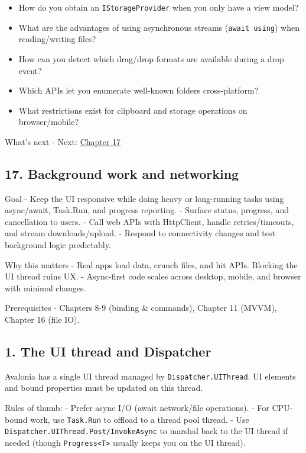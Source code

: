 \begin{itemize}
\tightlist
\item
  How do you obtain an \passthrough{\lstinline!IStorageProvider!} when
  you only have a view model?
\item
  What are the advantages of using asynchronous streams
  (\passthrough{\lstinline!await using!}) when reading/writing files?
\item
  How can you detect which drag/drop formats are available during a drop
  event?
\item
  Which APIs let you enumerate well-known folders cross-platform?
\item
  What restrictions exist for clipboard and storage operations on
  browser/mobile?
\end{itemize}

What's next - Next: \href{Chapter17.md}{Chapter 17}

\newpage

\subsection{17. Background work and
networking}\label{background-work-and-networking}

Goal - Keep the UI responsive while doing heavy or long-running tasks
using async/await, Task.Run, and progress reporting. - Surface status,
progress, and cancellation to users. - Call web APIs with HttpClient,
handle retries/timeouts, and stream downloads/upload. - Respond to
connectivity changes and test background logic predictably.

Why this matters - Real apps load data, crunch files, and hit APIs.
Blocking the UI thread ruins UX. - Async-first code scales across
desktop, mobile, and browser with minimal changes.

Prerequisites - Chapters 8-9 (binding \& commands), Chapter 11 (MVVM),
Chapter 16 (file IO).

\subsection{1. The UI thread and
Dispatcher}\label{the-ui-thread-and-dispatcher}

Avalonia has a single UI thread managed by
\passthrough{\lstinline!Dispatcher.UIThread!}. UI elements and bound
properties must be updated on this thread.

Rules of thumb: - Prefer async I/O (await network/file operations). -
For CPU-bound work, use \passthrough{\lstinline!Task.Run!} to offload to
a thread pool thread. - Use
\passthrough{\lstinline!Dispatcher.UIThread.Post/InvokeAsync!} to
marshal back to the UI thread if needed (though
\passthrough{\lstinline!Progress<T>!} usually keeps you on the UI
thread).

